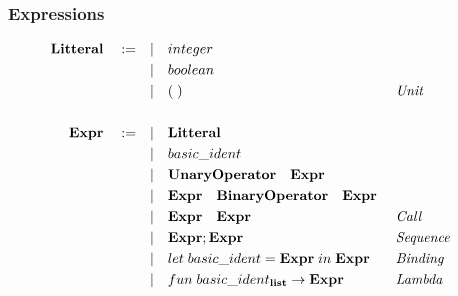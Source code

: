 \documentclass[
  12pt,
]{article}
\begin{document}
\hypertarget{expressions}{%
  \subsubsection{Expressions}\label{expressions}}

\begin{align*}
  \bf{Litteral}  \quad :=  \quad       & |\quad integer                                                                                                                       \\
                                       & |\quad boolean                                                                                                                       \\
                                       & |\quad (\;)                                                                                          &  & \textit{ Unit}             \\
  \\
  \bf{Expr}  \quad :=  \quad           & |\quad \textbf{Litteral}                                                                                                             \\
                                       & |\quad basic\_ident                                                                                                                  \\
                                       & |\quad \textbf{UnaryOperator}\quad \textbf{Expr}                                                                                     \\
                                       & |\quad \textbf{Expr}\quad \textbf{BinaryOperator}\quad \textbf{Expr}                                                                 \\
                                       & |\quad \textbf{Expr}\quad \textbf{Expr}                                                              &  & \textit{ Call}             \\
                                       & |\quad \textbf{Expr};\textbf{Expr}                                                                   &  & \textit{ Sequence }        \\
                                       & |\quad let \; basic\_ident = \textbf{Expr}\; in \; \textbf{Expr}                                     &  & \textit{ Binding}          \\
                                       & |\quad fun \; basic\_ident_{\bf{list}} \rightarrow  \textbf{Expr}                                    &  & \textit{ Lambda}           \\

\end{align*}
\end{document}
